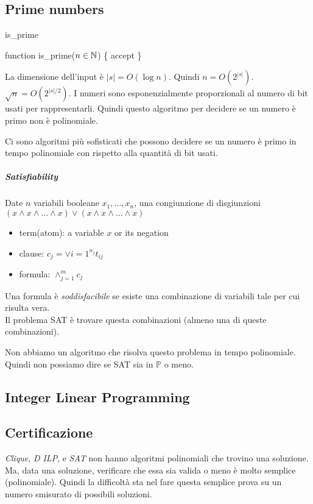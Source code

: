 \documentclass{article}
\begin{document}
\subsection{Prime numbers}
\begin{algorithm}
    \caption{is\_prime}
    function is\_prime($n\in\mathbb N$) \{\;
        accept\;
    \}
\end{algorithm}

La dimensione dell'input è $|s| = O(\log n)$. Quindi $n=O(2^{|s|})$. $\sqrt{n}=O(2^{|s|/2})$. I numeri sono esponenzialmente proporzionali al numero di bit usati per rappresentarli. Quindi questo algoritmo per decidere se un numero è primo non è polinomiale.

Ci sono algoritmi più sofisticati che possono decidere se un numero è primo in tempo polinomiale con rispetto alla quantità di bit usati.

\subparagraph{Satisfiability}
Date $n$ variabili booleane $x_1,\dots,x_n$, una congiunzione di disgiunzioni $(x\wedge x\wedge\dots\wedge x) \vee (x\wedge x\wedge\dots\wedge x)$

\begin{itemize}
    \item term(atom): a variable $x$ or its negation
    \item clause: $c_j=\vee{i=1}^{n_j} t_{ij}$
    \item formula: $\wedge_{j=1}^m c_j$
\end{itemize}

Una formula è \textit{soddisfacibile} se esiste una combinazione di variabili tale per cui risulta vera.\\
Il problema SAT è trovare questa combinazioni (almeno una di queste combinazioni).

Non abbiamo un algoritmo che risolva questo problema in tempo polinomiale. Quindi non possiamo dire se SAT sia in $\mathbb{P}$ o meno.

\subsection{Integer Linear Programming}

\subsection{Certificazione}
\textit{Clique}, \textit{D ILP}, e \textit{SAT} non hanno algoritmi polinomiali che trovino una soluzione. Ma, data una soluzione, verificare che essa sia valida o meno è molto semplice (polinomiale). Quindi la difficoltà sta nel fare questa semplice prova su un numero smisurato di possibili soluzioni.
\end{document}

